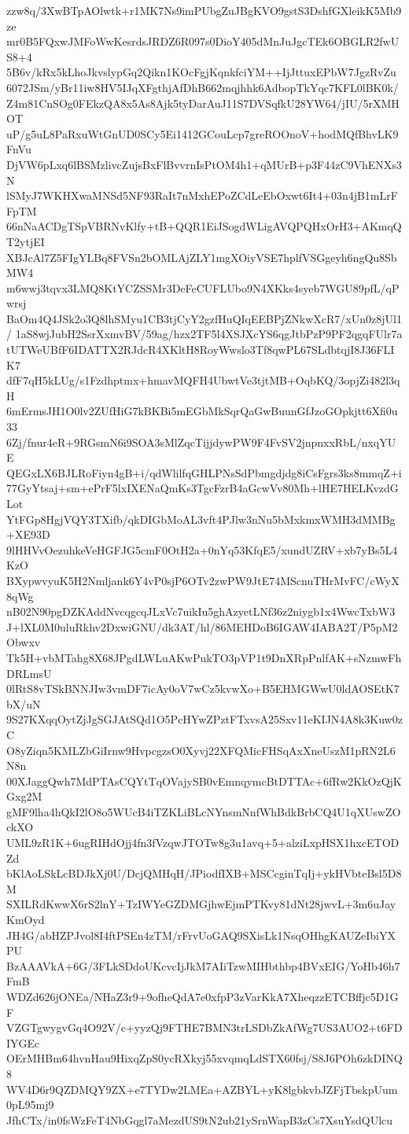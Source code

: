 zzw8q/3XwBTpAOlwtk+r1MK7Ns9imPUbgZuJBgKVO9gstS3DshfGXleikK5Mb9ze
mr0B5FQxwJMFoWwKesrdsJRDZ6R097s0DioY405dMnJuJgcTEk6OBGLR2fwUS8+4
5B6v/kRx5kLhoJkvslypGq2Qikn1KOcFgjKqnkfciYM++IjJttuxEPbW7JgzRvZu
6072JSm/yBr11iw8HV5IJqXFgthjAfDhB662mqjhhk6AdbopTkYqc7KFL0lBK0k/
Z4m81CnSOg0FEkzQA8x5As8Ajk5tyDarAuJ11S7DVSqfkU28YW64/jIU/5rXMHOT
uP/g5uL8PaRxuWtGnUD0SCy5Ei1412GCouLcp7greROOnoV+hodMQfBhvLK9FnVu
DjVW6pLxq6lBSMzlivcZujsBxFlBvvrnIsPtOM4h1+qMUrB+p3F44zC9VhENXs3N
lSMyJ7WKHXwaMNSd5NF93RaIt7nMxhEPoZCdLeEbOxwt6It4+03n4jB1mLrFFpTM
66nNaACDgTSpVBRNvKlfy+tB+QQR1EiJSogdWLigAVQPQHxOrH3+AKmqQT2ytjEI
XBJcAl7Z5FIgYLBq8FVSn2bOMLAjZLY1mgXOiyVSE7hplfVSGgeyh6ngQu8SbMW4
m6wwj3tqvx3LMQ8KtYCZSSMr3DeFeCUFLUbo9N4XKks4syeb7WGU89pfL/qPwrsj
BaOm4Q4JSk2o3Q8lhSMyu1CB3tjCyY2gzfHuQIqEEBPjZNkwXcR7/xUn0z8jUl1/
1aS8wjJubH2SsrXxmvBV/59ag/hzx2TF5l4XSJXcYS6qgJtbPzP9PF2qgqFUlr7a
tUTWeUBfF6IDATTX2RJdcR4XKltH8RoyWwslo3Tf8qwPL67SLdbtqjI8J36FLIK7
dfF7qH5kLUg/s1Fzdhptmx+hmavMQFH4UbwtVe3tjtMB+OqbKQ/3opjZi482l3qH
6mErmsJH1O0lv2ZUfHiG7kBKBi5mEGbMkSqrQaGwBuunGfJzoGOpkjtt6Xfi0u33
6Zj/fnur4eR+9RGsmN6i9SOA3sMlZqcTijjdywPW9F4FvSV2jnpnxxRbL/nxqYUE
QEGxLX6BJLRoFiyn4gB+i/qdWlilfqGHLPNsSdPbmgdjdg8iCsFgrs3ks8mmqZ+i
77GyYtsaj+sm+ePrF5lxIXENaQmKs3TgcFzrB4aGcwVv80Mh+lHE7HELKvzdGLot
YtFGp8HgjVQY3TXifb/qkDIGbMoAL3vft4PJlw3nNu5bMxkmxWMH3dMMBg+XE93D
9lHHVvOezuhkeVeHGFJG5cmF0OtH2a+0nYq53KfqE5/xundUZRV+xb7yBs5L4KzO
BXypwvyuK5H2Nmljank6Y4vP0sjP6OTv2zwPW9JtE74MScnuTHrMvFC/cWyX8qWg
nB02N90pgDZKAddNvcqgcqJLxVc7uikIu5ghAzyetLNf36z2niygb1x4WwcTxbW3
J+lXL0M0uluRkhv2DxwiGNU/dk3AT/hl/86MEHDoB6IGAW4IABA2T/P5pM2Obwxv
Tk5H+vbMTahg8X68JPgdLWLuAKwPukTO3pVP1t9DnXRpPnlfAK+sNzmwFhDRLmsU
0lRtS8vTSkBNNJIw3vmDF7icAy0oV7wCz5kvwXo+B5EHMGWwU0ldAOSEtK7bX/uN
9S27KXqqOytZjJgSGJAtSQd1O5PcHYwZPztFTxvsA25Sxv11eKIJN4A8k3Kuw0zC
O8yZiqn5KMLZbGiIrnw9HvpcgzsO0Xyvj22XFQMicFHSqAxXneUszM1pRN2L6N8n
00XJaggQwh7MdPTAsCQYtTqOVajySB0vEmnqymcBtDTTAc+6fRw2KkOzQjKGxg2M
gMF9lha4hQkI2lO8o5WUcB4iTZKLiBLcNYnsmNnfWhBdkBrbCQ4U1qXUswZOckXO
UML9zR1K+6ugRIHdOjj4fn3fVzqwJTOTw8g3u1avq+5+alziLxpHSX1hxcETODZd
bKlAoLSkLcBDJkXj0U/DcjQMHqH/JPiodfIXB+MSCcginTqIj+ykHVbteBsl5D8M
SXILRdKwwX6rS2lnY+TzIWYeGZDMGjhwEjmPTKvy81dNt28jwvL+3m6uJayKmOyd
JH4G/abHZPJvol8I4ftPSEn4zTM/rFrvUoGAQ9SXisLk1NsqOHhgKAUZeIbiYXPU
BzAAAVkA+6G/3FLkSDdoUKcvcIjJkM7AIiTzwMIHbthbp4BVxEIG/YoHb46h7FmB
WDZd626jONEa/NHaZ3r9+9ofheQdA7e0xfpP3zVarKkA7XheqzzETCBffjc5D1GF
VZGTgwygvGq4O92V/c+yyzQj9FTHE7BMN3trLSDbZkAfWg7US3AUO2+t6FDIYGEc
OErMHBm64hvnHau9HixqZpS0ycRXkyj55xvqmqLdSTX60fsj/S8J6POh6zkDINQ8
WV4D6r9QZDMQY9ZX+e7TYDw2LMEa+AZBYL+yK8lgbkvbJZFjTbskpUum0pL95mj9
JfhCTx/in0fsWzFeT4NbGqgl7aMezdUS9tN2ub21ySrnWapB3zCs7XsuYsdQUlcu
